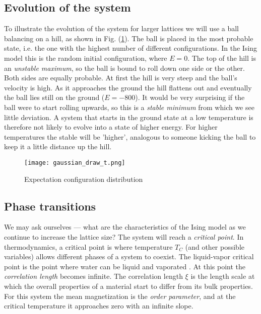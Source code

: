 \documentclass[11pt]{article}
\begin{document}
\subsection{Evolution of the system}

\begin{flushleft}
To illustrate the evolution of the system for larger lattices we will use a ball balancing on a hill, as shown in Fig. (\ref{fig::illustration}). The ball is placed in the most probable state, i.e. the one with the highest number of different configurations. In the Ising model this is the random initial configuration, where $E=0$. The top of the hill is an \textit{unstable maximum}, so the ball is bound to roll down one side or the other. Both sides are equally probable. At first the hill is very steep and the ball's velocity is high. As it approaches the ground the hill flattens out and eventually the ball lies still on the ground ($E=-800$). It would be very surprising if the ball were to start rolling upwards, so this is a \textit{stable minimum} from which we see little deviation. A system that starts in the ground state at a low temperature is therefore not likely to evolve into a state of higher energy. For higher temperatures the stable will be 'higher', analogous to someone kicking the ball to keep it a little distance up the hill.

\begin{figure}[H]
\centering
\texttt{[image: gaussian\_draw\_t.png]}
\caption{Expectation configuration distribution}
\label{fig::illustration}
\end{figure}

\end{flushleft}



\subsection{Phase transitions}

\begin{flushleft}
We may ask ourselves --- what are the characteristics of the Ising model as we continue to increase the lattice size? The system will reach a \textit{critical point}. In thermodynamics, a critical point is where temperature $T_C$ (and other possible variables) allows different phases of a system to coexist. The liquid-vapor critical point is the point where water can be liquid and vaporated \cite{schroeder2000introduction}. At this point the \textit{correlation length} becomes infinite. The correlation length $\xi$ is the length scale at which the overall properties of a material start to differ from its bulk properties. For this system the mean magnetization is the \textit{order parameter}, and at the critical temperature it approaches zero with an infinite slope.
\end{flushleft}
\end{document}
